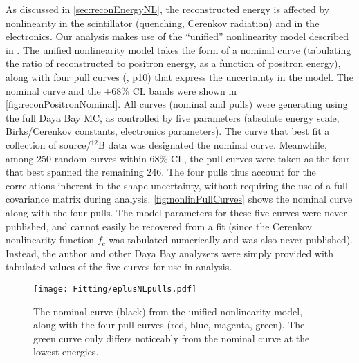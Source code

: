 \documentclass[../thesis.tex]{subfiles}
\begin{document}
As discussed in \autoref{sec:reconEnergyNL}, the reconstructed energy is affected by nonlinearity in the scintillator (quenching, Cerenkov radiation) and in the electronics. Our analysis makes use of the ``unified'' nonlinearity model described in \cite{EnergyModelUpdateYongbo}.
The unified nonlinearity model takes the form of a nominal curve (tabulating the ratio of reconstructed to positron energy, as a function of positron energy), along with four pull curves (\cite{EnergyModelUpdateSoeren}, p10) that express the uncertainty in the model. The nominal curve and the $\pm68\%$ CL bands were shown in \autoref{fig:reconPositronNominal}. All curves (nominal and pulls) were generating using the full Daya Bay MC, as controlled by five parameters (absolute energy scale, Birks/Cerenkov constants, electronics parameters). The curve that best fit a collection of source/$^{12}$B data was designated the nominal curve. Meanwhile, among 250 random curves within 68\% CL, the pull curves were taken as the four that best spanned the remaining 246. The four pulls thus account for the correlations inherent in the shape uncertainty, without requiring the use of a full covariance matrix during analysis. \autoref{fig:nonlinPullCurves} shows the nominal curve along with the four pulls. The model parameters for these five curves were never published, and cannot easily be recovered from a fit (since the Cerenkov nonlinearity function $f_c$ was tabulated numerically and was also never published). Instead, the author and other Daya Bay analyzers were simply provided with tabulated values of the five curves for use in analysis.

\begin{figure}[ht]
  \texttt{[image: Fitting/eplusNLpulls.pdf]}
  \caption{The nominal curve (black) from the unified nonlinearity model, along with the four pull curves (red, blue, magenta, green). The green curve only differs noticeably from the nominal curve at the lowest energies.}
  \label{fig:nonlinPullCurves}
\end{figure}
\end{document}
